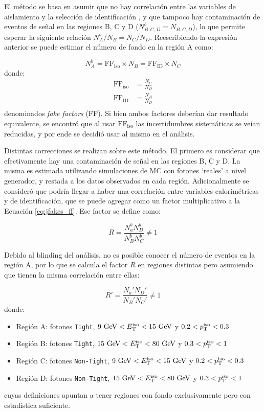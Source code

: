 El método se basa en asumir que no hay correlación entre las variables de aislamiento y la selección de identificación \cite{tesis_tony}, y que tampoco hay contaminación de eventos de señal en las regiones B, C y D ($N_{B,C,D}^b=N_{B,C,D}$), lo que permite esperar la siguiente relación $N_A^b/N_B=N_C/N_D$. 
Reescribiendo la expresión anterior se puede estimar el número de fondo en la región A como:

\begin{equation}
  N_A^b = \text{FF}_{\text{iso}}\times N_B = \text{FF}_{\text{ID}}\times N_C
  \label{eq:jfakes_ff}
\end{equation}
%
donde:
\begin{equation}
  \begin{split}
    \text{FF}_{\text{iso}} &= \frac{N_C}{N_D} \\
    \text{FF}_{\text{ID}} &= \frac{N_B}{N_D} \\
  \end{split}
\end{equation}
%
denominados \textit{fake factors} (FF). 
Si bien ambos factores deberían dar resultado equivalente, se encontró que al usar $\text{FF}_{\text{iso}}$ las incertidumbres sistemáticas se veían reducidas, y por ende se decidió usar al mismo en el análisis.

Distintas correcciones se realizan sobre este método. El primero es considerar que efectivamente hay una contaminación de señal en las regiones B, C y D. La misma es estimada utilizando simulaciones de MC con fotones `reales' a nivel generador, y restada a los datos observados en cada región. Adicionalmente se consideró que podría llegar a haber una correlación entre variables calorimétricas y de identificación, que se puede agregar como un factor multiplicativo a la Ecuación \ref{eq:jfakes_ff}. Ese factor se define como:

\begin{equation}
  R = \frac{N_a^b N_D^b}{N_B^b N_C^b} \neq 1
\end{equation}

Debido al blinding del análisis, no es posible conocer el número de eventos en la región A, por lo que se calcula el factor $R$ en regiones distintas pero asumiendo que tienen la misma correlación entre ellas:

\begin{equation}
  R' = \frac{N_a' N_D'}{N_B' N_C'} \neq 1
\end{equation}
%
donde:
\begin{itemize}
  \item Región A: fotones \texttt{Tight}, $9\ \text{GeV}<E_{\text{T}}^{\text{iso}}<15\ \text{GeV}$ y $0.2<p_{\text{T}}^{\text{iso}}<0.3$
  \item Región B: fotones \texttt{Tight}, $15\ \text{GeV}<E_{\text{T}}^{\text{iso}}<80\ \text{GeV}$ y $0.3<p_{\text{T}}^{\text{iso}}<1$
  \item Región C: fotones \texttt{Non-Tight}, $9\ \text{GeV}<E_{\text{T}}^{\text{iso}}<15\ \text{GeV}$ y $0.2<p_{\text{T}}^{\text{iso}}<0.3$
  \item Región D: fotones \texttt{Non-Tight}, $15\ \text{GeV}<E_{\text{T}}^{\text{iso}}<80\ \text{GeV}$ y $0.3<p_{\text{T}}^{\text{iso}}<1$
\end{itemize}
%
cuyas definiciones apuntan a tener regiones con fondo exclusivamente pero con estadística suficiente.

